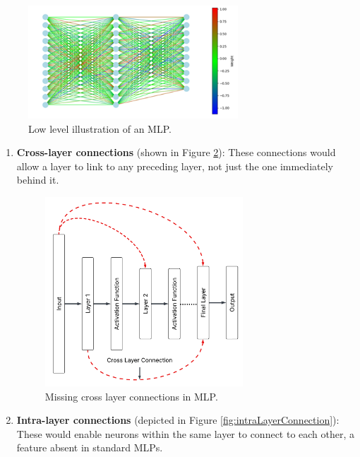 \begin{figure}[h!]
\centering
\includegraphics[width=0.7\textwidth]{Figures/Methodology/mlp_structural_diagram.png}
\caption{Low level illustration of an MLP.}
\label{fig:mlpStructure}
\end{figure}


\begin{enumerate}
    \item \textbf{Cross-layer connections} (shown in Figure \ref{fig:crossLayerConnection}): These connections would allow a layer to link to any preceding layer, not just the one immediately behind it.
    \begin{figure}[h!]
    \centering
    \includegraphics[width=0.7\textwidth]{Figures/Methodology/cross_layer_connections.png}
    \caption{Missing cross layer connections in MLP.}
    \label{fig:crossLayerConnection}
    \end{figure}

    \item \textbf{Intra-layer connections} (depicted in Figure \ref{fig:intraLayerConnection}): These would enable neurons within the same layer to connect to each other, a feature absent in standard MLPs.
    

\end{enumerate}
